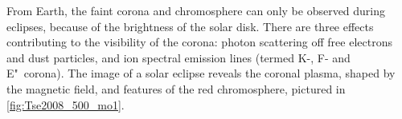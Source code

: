 From Earth, the faint corona and chromosphere can only be observed during eclipses, because of the brightness of the solar disk. There are three effects contributing to the visibility of the corona: photon scattering off free electrons and dust particles, and ion spectral emission lines (termed K-, F- and E"~corona).
The image of a solar eclipse reveals the coronal plasma, shaped by the magnetic field, and features of the red chromosphere, pictured in \autoref{fig:Tse2008_500_mo1}.\\
\begin{figure}[htb]
\end{figure}

